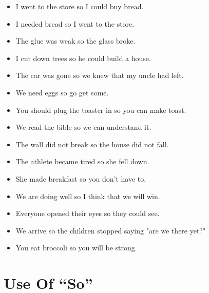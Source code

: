\documentclass[letterpaper, 17pt]{article}
\begin{document}
\begin{itemize}
	\item I went to the store so I could buy bread.	%
	\item I needed bread so I went to the store.	%
	\item The glue was weak so the glass broke.	%
	\item I cut down trees so he could build a house.	%
	\item The car was gone so we knew that my uncle had left.	%
	\item We need eggs so go get some.	%
	\item You should plug the toaster in so you can make toast.	%
	\item We read the bible so we can understand it.	%
	\item The wall did not break so the house did not fall.	%
	\item The athlete became tired so she fell down.	%
	\item She made breakfast so you don't have to.	%
	\item We are doing well so I think that we will win.	%
	\item Everyone opened their eyes so they could see.	%
	\item We arrive so the children stopped saying "are we there yet?"	%
	\item You eat broccoli so you will be strong.	%
\end{itemize}

\newpage
\section*{Use Of ``So''}
\end{document}
